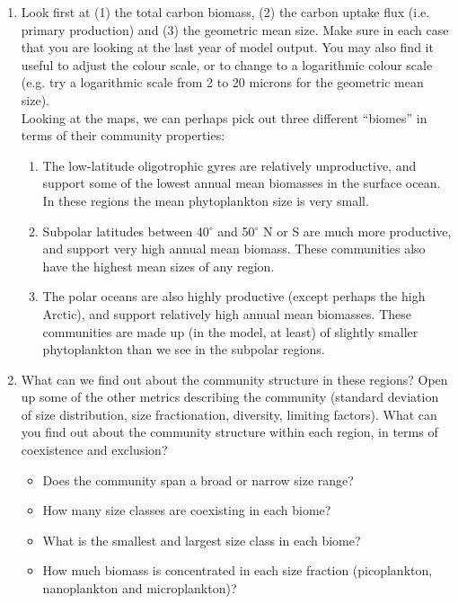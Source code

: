 \documentclass[11pt,fleqn]{book} %
\begin{document}
\vspace{2mm}
\begin{enumerate}[noitemsep]

\item Look first at (1) the total carbon biomass, (2) the carbon uptake flux (i.e. primary production) and (3) the geometric mean size. Make sure in each case that you are looking at the last year of model output. You may also find it useful to adjust the colour scale, or to change to a logarithmic colour scale (e.g. try a logarithmic scale from 2 to 20 microns for the geometric mean size).
\\Looking at the maps, we can perhaps pick out three different ``biomes'' in terms of their community properties:
\begin{enumerate}
\item The low-latitude oligotrophic gyres are relatively unproductive, and support some of the lowest annual mean biomasses in the surface ocean. In these regions the mean phytoplankton size is very small. 
\item Subpolar latitudes between 40$^\circ$ and 50$^\circ$ N or S are much more productive, and support very high annual mean biomass. These communities also have the highest mean sizes of any region.
\item The polar oceans are also highly productive (except perhaps the high Arctic), and support relatively high annual mean biomasses. These communities are made up (in the model, at least) of slightly smaller phytoplankton than we see in the subpolar regions.
\end{enumerate}

\item What can we find out about the community structure in these regions? Open up some of the other metrics describing the community (standard deviation of size distribution, size fractionation, diversity, limiting factors). What can you find out about the community structure within each region, in terms of coexistence and exclusion?
\begin{itemize}
\item Does the community span a broad or narrow size range?
\item How many size classes are coexisting in each biome?
\item What is the smallest and largest size class in each biome?
\item How much biomass is concentrated in each size fraction (picoplankton, nanoplankton and microplankton)?
\end{itemize}

\end{enumerate}
\vspace{2mm}
\end{document}
